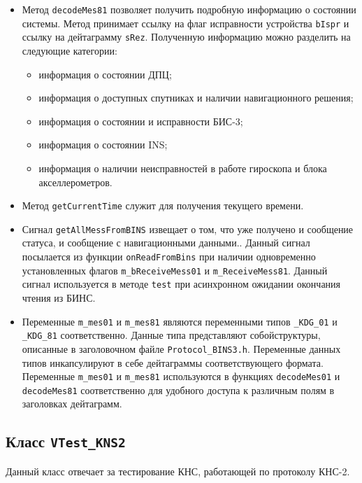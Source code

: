 \begin{itemize}
	\item Метод \texttt{decodeMes81} позволяет получить подробную информацию о состоянии системы. Метод принимает
		ссылку на флаг исправности устройства \texttt{bIspr} и ссылку на дейтаграмму \texttt{sRez}. Полученную
		информацию можно разделить на следующие категории:
		\begin{itemize}
				\item информация о состоянии ДПЦ;
				\item информация о доступных спутниках и наличии навигационного решения;
				\item информация о состоянии и исправности БИС-3;
				\item информация о состоянии INS;
				\item информация о наличии неисправностей в работе гироскопа и блока акселлерометров.
		\end{itemize}

	\item Метод \texttt{getCurrentTime} служит для получения текущего времени.

	\item Сигнал \texttt{getAllMessFromBINS} извещает о том, что уже получено и сообщение статуса, и сообщение с
		навигационными данными.. Данный сигнал посылается из функции \texttt{onReadFromBins} при наличии
		одновременно установленных флагов
		\texttt{m\_bReceiveMess01} и \texttt{m\_ReceiveMess81}. Данный сигнал используется в методе
		\texttt{test} при асинхронном ожидании окончания чтения из БИНС.

	\item Переменные \texttt{m\_mes01} и \texttt{m\_mes81} являются переменными типов \texttt{\_KDG\_01} и
		\texttt{\_KDG\_81} соответственно. Данные типа представляют собой\break структуры, описанные в заголовочном
		файле \texttt{Protocol\_BINS3.h}. Переменные данных типов инкапсулируют в себе дейтаграммы
		соответствующего формата. Переменные \texttt{m\_mes01} и \texttt{m\_mes81} используются в функциях
		\texttt{decodeMes01} и \texttt{decodeMes81} соответственно для удобного доступа к различным полям в
		заголовках дейтаграмм.
\end{itemize}

\subsection{Класс \texttt{VTest\_KNS2}}
Данный класс отвечает за тестирование КНС, работающей по протоколу КНС-2.

